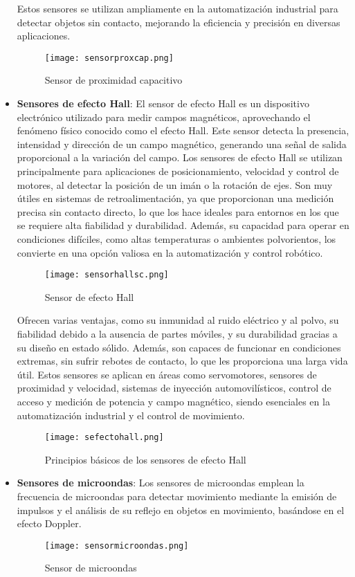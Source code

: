 \begin{itemize}
	Estos sensores se utilizan ampliamente en la automatización industrial para detectar objetos
	sin contacto, mejorando la eficiencia y precisión en diversas aplicaciones.
	\begin{figure}[H]
		\centering
		\texttt{[image: sensorproxcap.png]}
		\caption{Sensor de proximidad capacitivo} 
	\end{figure}
	\item \textbf{Sensores de efecto Hall}: El sensor de efecto Hall es un dispositivo electrónico utilizado para medir campos magnéticos, aprovechando el fenómeno físico conocido como el efecto Hall. Este sensor detecta la presencia, intensidad y dirección de un campo magnético, generando una señal de salida proporcional a la variación del campo. Los sensores de efecto Hall se utilizan principalmente para aplicaciones de posicionamiento, velocidad y control de motores, al detectar la posición de un imán o la rotación de ejes. Son muy útiles en sistemas de retroalimentación, ya que proporcionan una medición precisa sin contacto directo, lo que los hace ideales para entornos en los que se requiere alta fiabilidad y durabilidad. Además, su
	capacidad para operar en condiciones difíciles, como altas temperaturas o ambientes polvorientos, los convierte en una opción valiosa en la automatización y control robótico. 
	\begin{figure}[H]
		\centering
		\texttt{[image: sensorhallsc.png]}
		\caption{Sensor de efecto Hall} 
	\end{figure}
	Ofrecen varias ventajas, como su inmunidad al ruido eléctrico y al polvo, su fiabilidad debido a la ausencia de partes móviles, y su durabilidad gracias a su diseño en estado sólido. Además, son capaces de funcionar en condiciones extremas, sin sufrir rebotes de contacto, lo que les proporciona una larga vida útil. Estos sensores se aplican en áreas como servomotores, sensores de proximidad y velocidad, sistemas de inyección automovilísticos, control de acceso y medición de potencia y campo magnético, siendo esenciales en la
	automatización industrial y el control de movimiento.
	\begin{figure}[H]
		\centering
		\texttt{[image: sefectohall.png]}
		\caption{Principios básicos de los sensores de efecto Hall} 
	\end{figure}
	
	\item \textbf{Sensores de microondas}: Los sensores de microondas emplean la frecuencia de microondas para detectar movimiento mediante la emisión de impulsos y el análisis de su reflejo en objetos en movimiento, basándose en el efecto Doppler.
	\begin{figure}[H]
		\centering
		\texttt{[image: sensormicroondas.png]}
		\caption{Sensor de microondas} 
	\end{figure}
	

\end{itemize}

